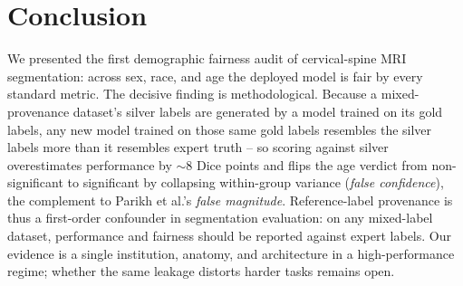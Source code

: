 \section{Conclusion}

We presented the first demographic fairness audit of cervical-spine MRI segmentation:
across sex, race, and age the deployed model is fair by every standard metric. The
decisive finding is methodological. Because a mixed-provenance dataset's silver labels
are generated by a model trained on its gold labels, any new model trained on those
same gold labels resembles the silver labels more than it resembles expert truth -- so
scoring against silver overestimates performance by ${\sim}8$ Dice points and flips the
age verdict from non-significant to significant by collapsing within-group variance
(\emph{false confidence}), the complement to Parikh et al.'s \emph{false magnitude}.
Reference-label provenance is thus a first-order confounder in segmentation
evaluation: on any mixed-label dataset, performance and fairness should be reported
against expert labels. Our evidence is a single institution, anatomy, and architecture in
a high-performance regime; whether the same leakage distorts harder tasks remains open.
